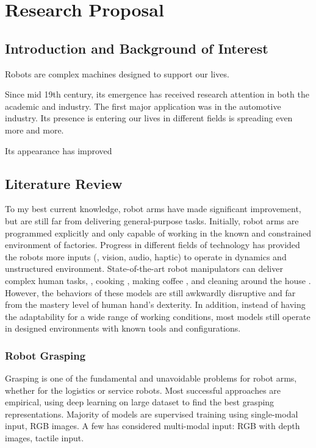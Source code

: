 \chapter{Research Proposal}

\section{Introduction and Background of Interest}


Robots are complex machines designed to support our lives.

Since mid 19th century, its emergence has received research attention in both the academic and industry. The first major application was in the automotive industry. Its presence is entering our lives in different fields is spreading even more and more.

Its appearance has improved 

\section{Literature Review}

To my best current knowledge, robot arms have made significant improvement, but are still far from delivering general-purpose tasks. Initially, robot arms are programmed explicitly and only capable of working in the known and constrained environment of factories. Progress in different fields of technology has provided the robots more inputs (\eg, vision, audio, haptic) to operate in dynamics and unstructured environment. State-of-the-art robot manipulators can deliver complex human tasks, \eg, cooking \cite{moley}, making coffee \cite{coffeemaster}, and cleaning around the house \cite{bothandy}. However, the behaviors of these models are still awkwardly disruptive and far from the mastery level of human hand's dexterity. In addition, instead of having the adaptability for a wide range of working conditions, most models still operate in designed environments with known tools and configurations.

\subsection{Robot Grasping}

Grasping is one of the fundamental and unavoidable problems for robot arms, whether for the logistics or service robots. Most successful approaches are empirical, using deep learning on large dataset to find the best grasping representations. Majority of models are supervised training using single-modal input, \ie RGB images. A few has considered multi-modal input: RGB with depth images, tactile input. \cite{caldera2018review, li2019review}

